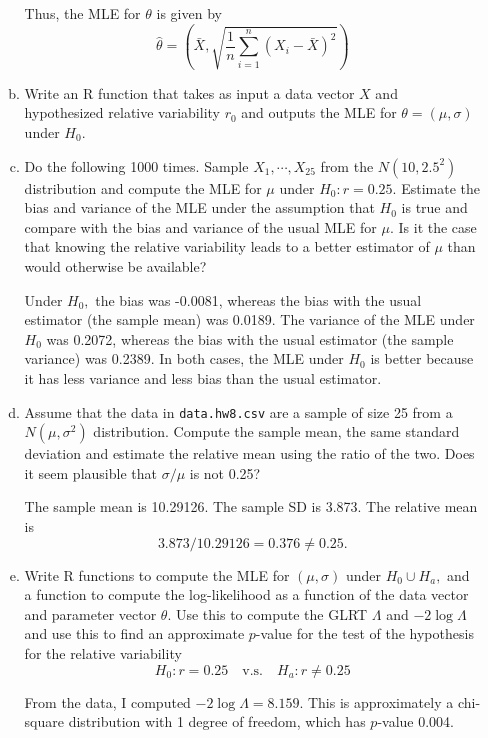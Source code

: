 \documentclass{article}
\begin{document}
\begin{itemize}
\begin{enumerate}[(a)]
\begin{soln}
					Thus, the MLE for $\theta$ is given by \[\hat\theta = \left( \bar{X}, \sqrt{\frac{1}{n} \sum_{i=1}^{n} (X_i-\bar{X})^2} \right)\]
				\end{soln}

			\item Write an R function that takes as input a data vector $X$ and hypothesized relative variability $r_0$ and outputs the MLE for $\theta=(\mu, \sigma)$ under $H_0.$

			\item Do the following 1000 times. Sample $X_1, \cdots, X_{25}$ from the $N(10, 2.5^2)$ distribution and compute the MLE for $\mu$ under $H_0: r=0.25.$ Estimate the bias and variance of the MLE under the assumption that $H_0$ is true and compare with the bias and variance of the usual MLE for $\mu.$ Is it the case that knowing the relative variability leads to a better estimator of $\mu$ than would otherwise be available?
				\begin{answer*}
					Under $H_0,$ the bias was -0.0081, whereas the bias with the usual estimator (the sample mean) was 0.0189. The variance of the MLE under $H_0$ was 0.2072, whereas the bias with the usual estimator (the sample variance) was 0.2389. In both cases, the MLE under $H_0$ is better because it has less variance and less bias than the usual estimator.
				\end{answer*}

			\item Assume that the data in \verb|data.hw8.csv| are a sample of size 25 from a $N(\mu, \sigma^2)$ distribution. Compute the sample mean, the same standard deviation and estimate the relative mean using the ratio of the two. Does it seem plausible that $\sigma/\mu$ is not 0.25?
				\begin{answer*}
					The sample mean is 10.29126. The sample SD is 3.873. The relative mean is \[3.873/10.29126=0.376\neq 0.25.\]
				\end{answer*}

			\item Write R functions to compute the MLE for $(\mu, \sigma)$ under $H_0\cup H_a,$ and a function to compute the log-likelihood as a function of the data vector and parameter vector $\theta.$ Use this to compute the GLRT $\Lambda$ and $-2\log \Lambda$ and use this to find an approximate $p$-value for the test of the hypothesis for the relative variability \[H_0:r=0.25\quad\text{v.s.}\quad H_a:r\neq 0.25\]
				\begin{answer*}
					From the data, I computed $-2\log \Lambda=8.159.$ This is approximately a chi-square distribution with 1 degree of freedom, which has $p$-value 0.004.
				\end{answer*}
				
		\end{enumerate}
\end{itemize}
\end{document}
